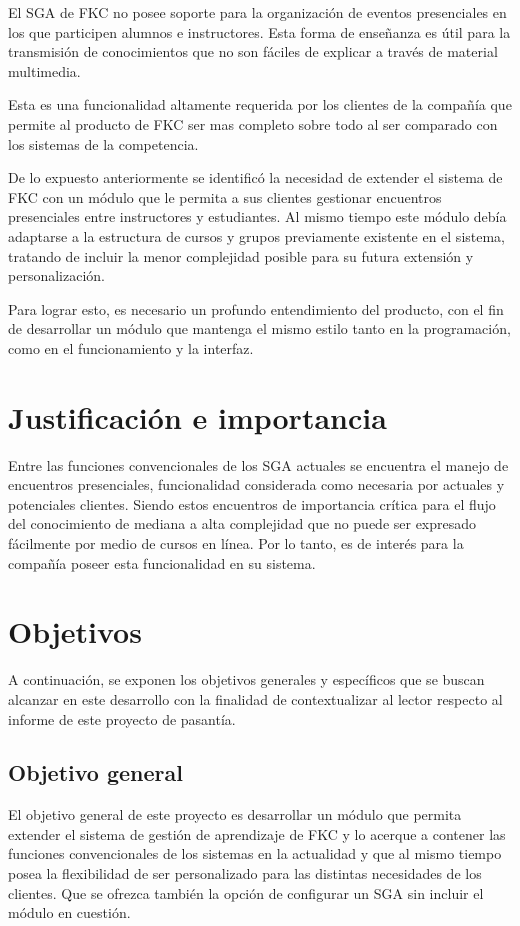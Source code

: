 El \gls{SGA} de \gls{FKC} no posee soporte para la organización de eventos presenciales en los que participen alumnos e instructores. Esta forma de enseñanza es útil para la transmisión de conocimientos que no son fáciles de explicar a través de material multimedia.

Esta es una funcionalidad altamente requerida por los clientes de la compañía que permite al producto de FKC ser mas completo sobre todo al ser comparado con los sistemas de la competencia.

De lo expuesto anteriormente se identificó la necesidad de extender el sistema de \gls{FKC} con un módulo que le permita a sus clientes gestionar encuentros presenciales entre instructores y estudiantes. Al mismo tiempo este módulo debía adaptarse a la estructura de cursos y grupos previamente existente en el sistema, tratando de incluir la menor complejidad posible para su futura extensión y personalización.

Para lograr esto, es necesario un profundo entendimiento del producto, con el fin de desarrollar un módulo que mantenga el mismo estilo tanto en la programación, como en el funcionamiento y la interfaz. 

\section*{Justificación e importancia}
Entre las funciones convencionales de los \gls{SGA} actuales se encuentra el manejo de encuentros presenciales, funcionalidad considerada como necesaria por actuales y potenciales clientes. Siendo estos encuentros de importancia crítica para el flujo del conocimiento de mediana a alta complejidad que no puede ser expresado fácilmente por medio de cursos en línea. Por lo tanto, es de interés para la compañía poseer esta funcionalidad en su sistema.

\section*{Objetivos}
A continuación, se exponen los objetivos generales y específicos que se buscan alcanzar en este desarrollo con la finalidad de contextualizar al lector respecto al informe de este proyecto de pasantía.

\subsection*{Objetivo general}
El objetivo general de este proyecto es desarrollar un módulo que permita extender el sistema de gestión de aprendizaje de \gls{FKC} y lo acerque a contener las funciones convencionales de los sistemas en la actualidad y que al mismo tiempo posea la flexibilidad de ser personalizado para las distintas necesidades de los clientes. Que se ofrezca también la opción de configurar un \gls{SGA} sin incluir el módulo en cuestión.



